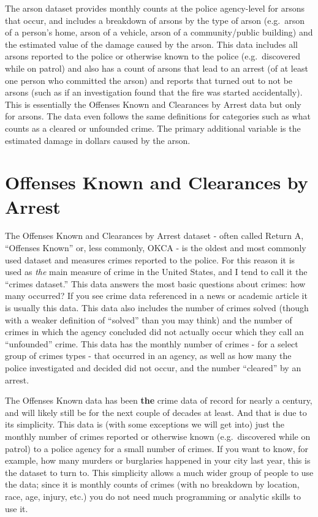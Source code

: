 \documentclass[
]{krantz}
\begin{document}
The arson dataset provides monthly counts at the police
agency-level for arsons that occur, and includes a breakdown
of arsons by the type of arson (e.g.~arson of a person's
home, arson of a vehicle, arson of a community/public
building) and the estimated value of the damage caused by
the arson. This data includes all arsons reported to the
police or otherwise known to the police (e.g.~discovered
while on patrol) and also has a count of arsons that lead to
an arrest (of at least one person who committed the arson)
and reports that turned out to not be arsons (such as if an
investigation found that the fire was started accidentally).
This is essentially the Offenses Known and Clearances by
Arrest data but only for arsons. The data even follows the
same definitions for categories such as what counts as a
cleared or unfounded crime. The primary additional variable
is the estimated damage in dollars caused by the arson.

\chapter{Offenses Known and Clearances by
Arrest}\label{offensesKnown}

The Offenses Known and Clearances by Arrest dataset - often
called Return A, ``Offenses Known'' or, less commonly, OKCA
- is the oldest and most commonly used dataset and measures
crimes reported to the police. For this reason it is used as
\emph{the} main measure of crime in the United States, and I
tend to call it the ``crimes dataset.'' This data answers
the most basic questions about crimes: how many occurred? If
you see crime data referenced in a news or academic article
it is usually this data. This data also includes the number
of crimes solved (though with a weaker definition of
``solved'' than you may think) and the number of crimes in
which the agency concluded did not actually occur which they
call an ``unfounded'' crime. This data has the monthly
number of crimes - for a select group of crimes types - that
occurred in an agency, as well as how many the police
investigated and decided did not occur, and the number
``cleared'' by an arrest.

The Offenses Known data has been \textbf{the} crime data of
record for nearly a century, and will likely still be for
the next couple of decades at least. And that is due to its
simplicity. This data is (with some exceptions we will get
into) just the monthly number of crimes reported or
otherwise known (e.g.~discovered while on patrol) to a
police agency for a small number of crimes. If you want to
know, for example, how many murders or burglaries happened
in your city last year, this is the dataset to turn to. This
simplicity allows a much wider group of people to use the
data; since it is monthly counts of crimes (with no
breakdown by location, race, age, injury, etc.) you do not
need much programming or analytic skills to use it.
\end{document}
